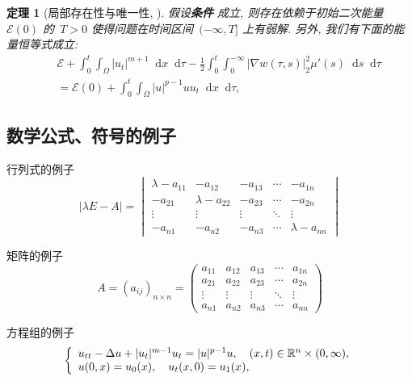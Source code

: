 \documentclass[UTF8,oneside,12pt]{article}  %
\theoremstyle{DingLi1}
\numberwithin{equation}{section}
\newtheorem{theorem}{\hspace{2em}定理}[section]
\theoremstyle{DingLi2}
\def\d{\mathop{}\!\mathrm{d}} %
\begin{document}
\begin{theorem}[局部存在性与唯一性, \cite{Liang-Xu-Auto18}]  \label{Thm: local existence}
 假设\textbf{条件} 成立, 则存在依赖于初始二次能量~$\mathscr{E}(0)$ 的~$T>0$ 使得问题在时间区间~$(-\infty, T]$ 上有弱解. 另外, 我们有下面的能量恒等式成立:
\begin{eqnarray}
&&\mathscr{E}+\int_0^t\int_\Omega |u_t|^{m+1} \d x\d \tau-\frac12 \int_0^t\int_0^{-\infty}|\nabla w(\tau,s)|_2^2 \mu'(s)\d s\d \tau\nonumber\\
&&=\mathscr{E}(0)+\int_0^t\int_\Omega |u|^{p-1}uu_t\d x\d\tau,\label{4 quadratic energy identity}
\end{eqnarray}
\end{theorem}

\subsection{数学公式、符号的例子}

行列式的例子
\begin{equation*}
  |\lambda E- A|=
  \begin{vmatrix}
   \lambda-a_{11} & -a_{12} & -a_{13}&\cdots &-a_{1n} \\
    -a_{21} & \lambda-a_{22} & -a_{23} &\cdots & -a_{2n}\\
    \vdots & \vdots & \vdots&\ddots&\vdots \\
    -a_{n1} & -a_{n2} & -a_{n3} &\cdots& \lambda -a_{nn}
 \end{vmatrix}
\end{equation*}

矩阵的例子
\begin{equation*}
A=(a_{ij})_{n\times n} =
\begin{pmatrix}
  a_{11} & a_{12} & a_{13} & \cdots & a_{1n}\\
  a_{21} & a_{22} & a_{23} &\cdots & a_{2n}\\
 \vdots & \vdots & \vdots & \ddots& \vdots\\
 a_{n1} & a_{n2} & a_{n3} &\cdots & a_{nn}
\end{pmatrix}
\end{equation*}

方程组的例子
\begin{equation*}
\left\{   %
    \begin{array}{l} %
      u_{tt}-\Delta u+|u_t|^{m-1}u_t=|u|^{p-1}u,\quad (x,t)\in \Bbb{R}^n\times (0,\infty),\\
      u(0,x)=u_0(x),\quad u_t(x,0)=u_1(x),
      \end{array}
\right.
\end{equation*}
\end{document}
